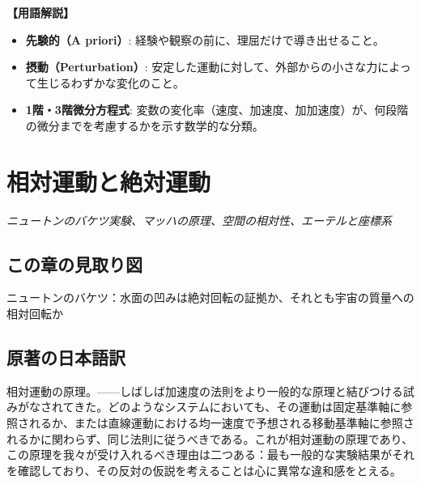 \documentclass[a4paper,11pt,openany]{ltjsbook}
\begin{document}
\begin{lecturebox}
\textbf{【用語解説】}
\begin{itemize}[leftmargin=2em]
\item \textbf{先験的（A priori）}: 経験や観察の前に、理屈だけで導き出せること。
\item \textbf{摂動（Perturbation）}: 安定した運動に対して、外部からの小さな力によって生じるわずかな変化のこと。
\item \textbf{1階・3階微分方程式}: 変数の変化率（速度、加速度、加加速度）が、何段階の微分までを考慮するかを示す数学的な分類。
\end{itemize}
\end{lecturebox}


\clearpage
\chapter{相対運動と絶対運動}
\begin{center}\large\textit{ニュートンのバケツ実験、マッハの原理、空間の相対性、エーテルと座標系}\end{center}

\section*{この章の見取り図}
\begin{center}


\small ニュートンのバケツ：水面の凹みは絶対回転の証拠か、それとも宇宙の質量への相対回転か
\end{center}

\section{原著の日本語訳}
相対運動の原理。——しばしば加速度の法則をより一般的な原理と結びつける試みがなされてきた。どのようなシステムにおいても、その運動は固定基準軸に参照されるか、または直線運動における均一速度で予想される移動基準軸に参照されるかに関わらず、同じ法則に従うべきである。これが相対運動の原理であり、この原理を我々が受け入れるべき理由は二つある：最も一般的な実験結果がそれを確認しており、その反対の仮説を考えることは心に異常な違和感をとえる。
\end{document}
